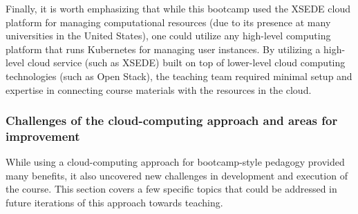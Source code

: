 Finally, it is worth emphasizing that while this bootcamp used
the XSEDE cloud platform for managing computational resources (due to its
presence at many universities in the United States),
one could utilize any high-level computing platform that runs Kubernetes for managing
user instances. By utilizing a high-level cloud service (such as XSEDE) built on
top of lower-level cloud computing technologies (such as Open Stack), the
teaching team required
minimal setup and expertise in connecting course materials with the resources in the cloud.

\subsubsection{Challenges of the cloud-computing approach and areas for improvement}

While using a cloud-computing approach for bootcamp-style pedagogy provided many
benefits, it also uncovered new challenges in development and execution of the
course. This section covers a few specific topics that could be addressed in
future iterations of this approach towards teaching.

